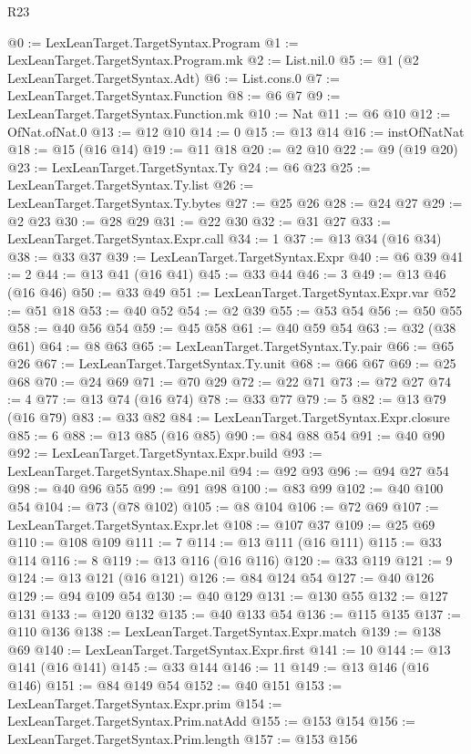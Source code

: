 \begin{lexlean}{R23}
\begin{coremodule}
{{{{{{{{{{{{{{{{{{{{{{{{{{{{{{{{{{{{{{{{{{{{{{{@0 := LexLeanTarget.TargetSyntax.Program
@1 := LexLeanTarget.TargetSyntax.Program.mk
@2 := List.nil.{0}
@5 := @1 (@2 LexLeanTarget.TargetSyntax.Adt)
@6 := List.cons.{0}
@7 := LexLeanTarget.TargetSyntax.Function
@8 := @6 @7
@9 := LexLeanTarget.TargetSyntax.Function.mk
@10 := Nat
@11 := @6 @10
@12 := OfNat.ofNat.{0}
@13 := @12 @10
@14 := 0
@15 := @13 @14
@16 := instOfNatNat
@18 := @15 (@16 @14)
@19 := @11 @18
@20 := @2 @10
@22 := @9 (@19 @20)
@23 := LexLeanTarget.TargetSyntax.Ty
@24 := @6 @23
@25 := LexLeanTarget.TargetSyntax.Ty.list
@26 := LexLeanTarget.TargetSyntax.Ty.bytes
@27 := @25 @26
@28 := @24 @27
@29 := @2 @23
@30 := @28 @29
@31 := @22 @30
@32 := @31 @27
@33 := LexLeanTarget.TargetSyntax.Expr.call
@34 := 1
@37 := @13 @34 (@16 @34)
@38 := @33 @37
@39 := LexLeanTarget.TargetSyntax.Expr
@40 := @6 @39
@41 := 2
@44 := @13 @41 (@16 @41)
@45 := @33 @44
@46 := 3
@49 := @13 @46 (@16 @46)
@50 := @33 @49
@51 := LexLeanTarget.TargetSyntax.Expr.var
@52 := @51 @18
@53 := @40 @52
@54 := @2 @39
@55 := @53 @54
@56 := @50 @55
@58 := @40 @56 @54
@59 := @45 @58
@61 := @40 @59 @54
@63 := @32 (@38 @61)
@64 := @8 @63
@65 := LexLeanTarget.TargetSyntax.Ty.pair
@66 := @65 @26
@67 := LexLeanTarget.TargetSyntax.Ty.unit
@68 := @66 @67
@69 := @25 @68
@70 := @24 @69
@71 := @70 @29
@72 := @22 @71
@73 := @72 @27
@74 := 4
@77 := @13 @74 (@16 @74)
@78 := @33 @77
@79 := 5
@82 := @13 @79 (@16 @79)
@83 := @33 @82
@84 := LexLeanTarget.TargetSyntax.Expr.closure
@85 := 6
@88 := @13 @85 (@16 @85)
@90 := @84 @88 @54
@91 := @40 @90
@92 := LexLeanTarget.TargetSyntax.Expr.build
@93 := LexLeanTarget.TargetSyntax.Shape.nil
@94 := @92 @93
@96 := @94 @27 @54
@98 := @40 @96 @55
@99 := @91 @98
@100 := @83 @99
@102 := @40 @100 @54
@104 := @73 (@78 @102)
@105 := @8 @104
@106 := @72 @69
@107 := LexLeanTarget.TargetSyntax.Expr.let
@108 := @107 @37
@109 := @25 @69
@110 := @108 @109
@111 := 7
@114 := @13 @111 (@16 @111)
@115 := @33 @114
@116 := 8
@119 := @13 @116 (@16 @116)
@120 := @33 @119
@121 := 9
@124 := @13 @121 (@16 @121)
@126 := @84 @124 @54
@127 := @40 @126
@129 := @94 @109 @54
@130 := @40 @129
@131 := @130 @55
@132 := @127 @131
@133 := @120 @132
@135 := @40 @133 @54
@136 := @115 @135
@137 := @110 @136
@138 := LexLeanTarget.TargetSyntax.Expr.match
@139 := @138 @69
@140 := LexLeanTarget.TargetSyntax.Expr.first
@141 := 10
@144 := @13 @141 (@16 @141)
@145 := @33 @144
@146 := 11
@149 := @13 @146 (@16 @146)
@151 := @84 @149 @54
@152 := @40 @151
@153 := LexLeanTarget.TargetSyntax.Expr.prim
@154 := LexLeanTarget.TargetSyntax.Prim.natAdd
@155 := @153 @154
@156 := LexLeanTarget.TargetSyntax.Prim.length
@157 := @153 @156
}}}}}}}}}}}}}}}}}}}}}}}}}}}}}}}}}}}}}}}}}}}}}}}
\end{coremodule}
\end{lexlean}
